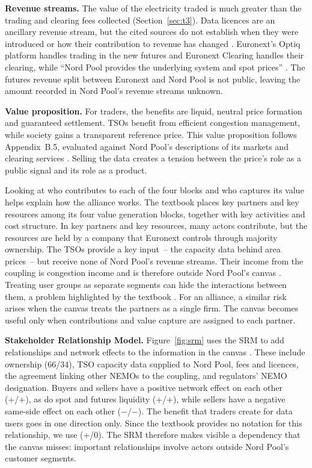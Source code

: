 \textbf{Revenue streams.} The value of the electricity traded is much greater than the trading and clearing fees collected (Section~\ref{sec:t3}). Data licences are an ancillary revenue stream, but the cited sources do not establish when they were introduced or how their contribution to revenue has changed \citep{ERR2022,NPData}. Euronext's Optiq platform handles trading in the new futures and Euronext Clearing handles their clearing, while ``Nord Pool provides the underlying system and spot prices'' \citep{Euronext2026}. The futures revenue split between Euronext and Nord Pool is not public, leaving the amount recorded in Nord Pool's revenue streams unknown.

\textbf{Value proposition.} For traders, the benefits are liquid, neutral price formation and guaranteed settlement. TSOs benefit from efficient congestion management, while society gains a transparent reference price. This value proposition follows Appendix~B.5, evaluated against Nord Pool's descriptions of its markets and clearing services \citep{NPAbout,NPClearing}. Selling the data creates a tension between the price's role as a public signal and its role as a product.

Looking at who contributes to each of the four blocks and who captures its value helps explain how the alliance works. The textbook places key partners and key resources among its four value generation blocks, together with key activities and cost structure. In key partners and key resources, many actors contribute, but the resources are held by a company that Euronext controls through majority ownership. The TSOs provide a key input~-- the capacity data behind area prices~-- but receive none of Nord Pool's revenue streams. Their income from the coupling is congestion income and is therefore outside Nord Pool's canvas \citep[Article~68]{CACM2015}. Treating user groups as separate segments can hide the interactions between them, a problem highlighted by the textbook \citep[Section~10.2.4]{OverbyAudestad2021}. For an alliance, a similar risk arises when the canvas treats the partners as a single firm. The canvas becomes useful only when contributions and value capture are assigned to each partner.



\textbf{Stakeholder Relationship Model.} Figure~\ref{fig:srm} uses the SRM to add relationships and network effects to the information in the canvas \citep[Section~19.3]{OverbyAudestad2021}. These include ownership (66/34), TSO capacity data supplied to Nord Pool, fees and licences, the agreement linking other NEMOs to the coupling, and regulators' NEMO designation. Buyers and sellers have a positive network effect on each other (+/+), as do spot and futures liquidity (+/+), while sellers have a negative same-side effect on each other ($-$/$-$). The benefit that traders create for data users goes in one direction only. Since the textbook provides no notation for this relationship, we use (+/0). The SRM therefore makes visible a dependency that the canvas misses: important relationships involve actors outside Nord Pool's customer segments.



